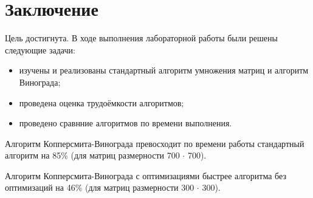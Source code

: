 \chapter*{Заключение}

Цель достигнута. В ходе выполнения лабораторной работы были решены следующие задачи:

\begin{itemize}
    \item изучены и реализованы стандартный алгоритм умножения матриц и алгоритм Винограда;
    \item проведена оценка трудоёмкости алгоритмов;
	\item проведено сравнние алгоритмов по времени выполнения.
\end{itemize}

Алгоритм Копперсмита-Винограда превосходит по времени работы стандартный алгоритм на 85\% (для матриц размерности 700 $\cdot$ 700). 

Алгоритм Копперсмита-Винограда с оптимизациями быстрее алгоритма без оптимизаций на 46\% (для матриц размерности 300 $\cdot$ 300).